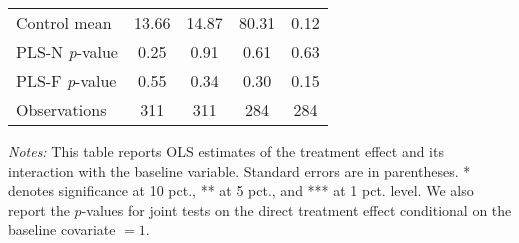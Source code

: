 \begin{table}[ht]
{\begin{threeparttable}
\begin{tabular}{l*{4}{c}}
Control mean    &    13.66         &    14.87         &    80.31         &     0.12         \\
PLS-N \emph{p}-value&     0.25         &     0.91         &     0.61         &     0.63         \\
PLS-F \emph{p}-value&     0.55         &     0.34         &     0.30         &     0.15         \\
Observations    &      311         &      311         &      284         &      284         \\
\bottomrule \end{tabular} \begin{tablenotes}[flushleft] \footnotesize \item \emph{Notes:} This table reports OLS estimates of the treatment effect and its interaction with the baseline variable. Standard errors are in parentheses. * denotes significance at 10 pct., ** at 5 pct., and *** at 1 pct. level. We also report the \(p\)-values for joint tests on the direct treatment effect conditional on the baseline covariate $= 1$. \end{tablenotes} \end{threeparttable} } \end{table}

